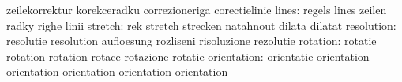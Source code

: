                            zeilekorrektur            korekceradku
                           correzioneriga            corectielinie
                    lines: regels                    lines
                           zeilen                    radky
                           righe                     linii
                  stretch: rek                       stretch
                           strecken                  natahnout
                           dilata                    dilatat %
               resolution: resolutie                 resolution
                           aufloesung                rozliseni
                           risoluzione               rezolutie
                 rotation: rotatie                   rotation
                           rotation                  rotace
                           rotazione                 rotatie
              orientation: orientatie                orientation
                           orientation               orientation
                           orientation               orientation


